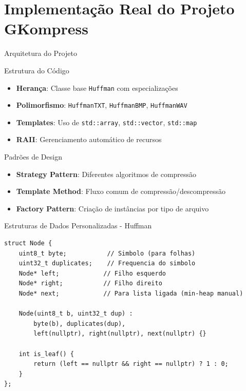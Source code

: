 \documentclass{beamer}
\begin{document}
\section{Implementação Real do Projeto GKompress}
\begin{frame}{Arquitetura do Projeto}
    \begin{block}{Estrutura do Código}
        \begin{itemize}
            \item \textbf{Herança}: Classe base \texttt{Huffman} com especializações
            \item \textbf{Polimorfismo}: \texttt{HuffmanTXT}, \texttt{HuffmanBMP}, \texttt{HuffmanWAV}
            \item \textbf{Templates}: Uso de \texttt{std::array}, \texttt{std::vector}, \texttt{std::map}
            \item \textbf{RAII}: Gerenciamento automático de recursos
        \end{itemize}
    \end{block}
    \begin{block}{Padrões de Design}
        \begin{itemize}
            \item \textbf{Strategy Pattern}: Diferentes algoritmos de compressão
            \item \textbf{Template Method}: Fluxo comum de compressão/descompressão
            \item \textbf{Factory Pattern}: Criação de instâncias por tipo de arquivo
        \end{itemize}
    \end{block}
\end{frame}

\begin{frame}[fragile]{Estruturas de Dados Personalizadas - Huffman}
    \begin{lstlisting}[style=CStyle, caption=Estrutura Node personalizada do projeto]
struct Node {
    uint8_t byte;           // Simbolo (para folhas)
    uint32_t duplicates;    // Frequencia do simbolo
    Node* left;            // Filho esquerdo
    Node* right;           // Filho direito
    Node* next;            // Para lista ligada (min-heap manual)
    
    Node(uint8_t b, uint32_t dup) : 
        byte(b), duplicates(dup), 
        left(nullptr), right(nullptr), next(nullptr) {}
        
    int is_leaf() {
        return (left == nullptr && right == nullptr) ? 1 : 0;
    }
};
    \end{lstlisting}
\end{frame}
\end{document}
